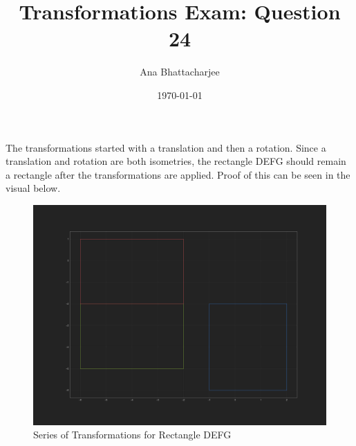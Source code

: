 \documentclass{article}
\begin{document}
\title{Transformations Exam: Question 24}
\author{Ana Bhattacharjee}
\date{\today}
\maketitle{}

\begin{center}
  The transformations started with a translation and then a rotation. Since a translation and rotation are both isometries, the rectangle DEFG should remain a rectangle after the transformations are applied. Proof of this can be seen in the visual below.
  \begin{figure}
    \includegraphics{exam.png}
    \caption{Series of Transformations for Rectangle DEFG}
  \end{figure}
\end{center}
\end{document}
